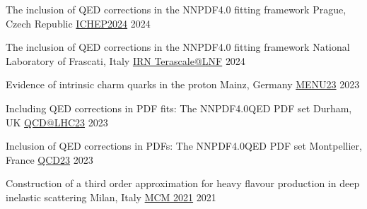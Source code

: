 \begin{cvhonors}

    \cvhonor
    {The inclusion of QED corrections in the NNPDF4.0 fitting framework} %
    {Prague, Czech Republic}
    {\href{https://indico.cern.ch/event/1291157/contributions/5876646/}{ICHEP2024}} %
    {2024}

    \cvhonor
    {The inclusion of QED corrections in the NNPDF4.0 fitting framework} %
    {National Laboratory of Frascati, Italy}
    {\href{https://indico.in2p3.fr/event/31806/contributions/136024/}{IRN Terascale@LNF}} %
    {2024}

    \cvhonor
    {Evidence of intrinsic charm quarks in the proton} %
    {Mainz, Germany}
    {\href{https://indico.him.uni-mainz.de/event/171/contributions/1438/}{MENU23}} %
    {2023}

    \cvhonor
    {Including QED corrections in PDF fits: The NNPDF4.0QED PDF set} %
    {Durham, UK}
    {\href{https://conference.ippp.dur.ac.uk/event/1128/contributions/6473/}{QCD@LHC23}} %
    {2023}

    \cvhonor
    {Inclusion of QED corrections in PDFs: The NNPDF4.0QED PDF set} %
    {Montpellier, France}
    {\href{https://qcd23.sciencesconf.org/}{QCD23}} %
    {2023}

    \cvhonor
    {Construction of a third order approximation for heavy flavour production in deep inelastic scattering} %
    {Milan, Italy}
    {\href{https://indico.cern.ch/event/1095418/contributions/4656984/}{MCM 2021}} %
    {2021}
    
    


\end{cvhonors}